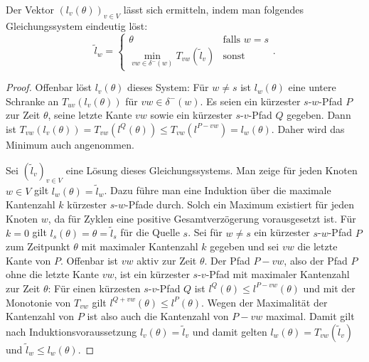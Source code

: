 \begin{proposition}
	Der Vektor $(l_v(\theta))_{v\in V}$ lässt sich ermitteln, indem man folgendes Gleichungssystem eindeutig löst:
	$$ \tilde{l}_w = \begin{cases}
	\theta & \text{falls } w=s \\
	\min\limits_{vw\in \delta^-(w)} T_{vw}(\tilde{l}_v) & \text{sonst}
	\end{cases}.$$
\end{proposition}
\begin{proof}
	Offenbar löst $l_v(\theta)$ dieses System:
	Für $w\neq s$ ist $l_w(\theta)$ eine untere Schranke an $T_{uv}(l_v(\theta))$ für $vw\in\delta^-(w)$.
	Es seien ein kürzester $s$-$w$-Pfad $P$ zur Zeit $\theta$, seine letzte Kante $vw$ sowie ein kürzester $s$-$v$-Pfad $Q$ gegeben.
	Dann ist $T_{vw}(l_v(\theta)) = T_{vw}(l^Q(\theta)) \leq T_{vw}(l^{P-vw}) = l_w(\theta)$.
	Daher wird das Minimum auch angenommen.
	
	Sei $(\tilde{l}_v)_{v\in V}$ eine Lösung dieses Gleichungssystems.
	Man zeige für jeden Knoten $w\in V$ gilt $l_w(\theta) = \tilde{l}_w$.
	Dazu führe man eine Induktion über die maximale Kantenzahl $k$ kürzester $s$-$w$-Pfade durch.
	Solch ein Maximum existiert für jeden Knoten $w$, da für Zyklen eine positive Gesamtverzögerung vorausgesetzt ist.
	Für $k=0$ gilt $l_s(\theta)=\theta = \tilde{l}_s$ für die Quelle $s$.
	Sei für $w\neq s$ ein kürzester $s$-$w$-Pfad $P$ zum Zeitpunkt $\theta$ mit maximaler Kantenzahl $k$ gegeben und sei $vw$ die letzte Kante von $P$.
	Offenbar ist $vw$ aktiv zur Zeit $\theta$.
	Der Pfad $P-vw$, also der Pfad $P$ ohne die letzte Kante $vw$, ist ein kürzester $s$-$v$-Pfad mit maximaler Kantenzahl zur Zeit $\theta$:
	Für einen kürzesten $s$-$v$-Pfad $Q$ ist $l^Q(\theta)\leq l^{P-vw}(\theta)$ und mit der Monotonie von $T_{vw}$ gilt $l^{Q+vw}(\theta)\leq l^P(\theta)$.
	Wegen der Maximalität der Kantenzahl von $P$ ist also auch die Kantenzahl von $P-vw$ maximal.
	Damit gilt nach Induktionsvoraussetzung $l_v(\theta) = \tilde{l}_v$
	und damit gelten $l_w(\theta) = T_{vw}(\tilde{l}_v)$ und $\tilde{l}_w \leq l_w(\theta)$.
\end{proof}
